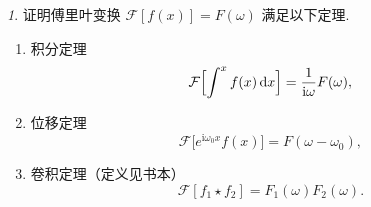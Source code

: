 \documentclass[11pt]{article}
\theoremstyle{remark}
\newtheorem{problem}{}
\theoremstyle{definition}
\begin{document}
\begin{problem}
  证明傅里叶变换 $\mathcal{F}[f(x)]=F(\omega)$ 满足以下定理.
  \begin{enumerate}
    \item 积分定理
    \[
      \mathcal{F}\Bigl[\int^{x} f(x)\,\mathrm{d}x\Bigr]
      =\frac{1}{\mathrm{i}\omega}F(\omega),
    \]
    \item 位移定理
    \[
      \mathcal{F}\bigl[e^{\mathrm{i}\omega_0 x}f(x)\bigr]
      =F(\omega-\omega_0),
    \]
    \item 卷积定理（定义见书本）
    \[
      \mathcal{F}[f_1\star f_2]=F_1(\omega)F_2(\omega).
    \]
  \end{enumerate}
\end{problem}
\end{document}
